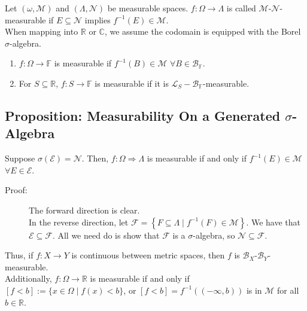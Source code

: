 \documentclass[9pt]{extarticle}
\newcommand{\R}{\mathbb{R}}
\begin{document}
  Let $(\omega,\mathcal{M})$ and $(\Lambda,\mathcal{N})$ be measurable spaces. $f: \Omega \rightarrow \Lambda$ is called $\mathcal{M}$-$\mathcal{N}$-measurable if $E\subseteq \mathcal{N}$ implies $f^{-1}(E)\in \mathcal{M}$.\\

  When mapping into $\R$ or $\mathbb{C}$, we assume the codomain is equipped with the Borel $\sigma$-algebra.
  \begin{enumerate}[(1)]
    \item $f: \Omega \rightarrow \mathbb{F}$ is measurable if $f^{-1}(B) \in \mathcal{M}$ $\forall B\in\mathcal{B}_{\mathbb{F}}$.
    \item For $S\subseteq \R$, $f:S\rightarrow \mathbb{F}$ is measurable if it is $\mathcal{L}_{S}-\mathcal{B}_{\mathbb{F}}$-measurable.
  \end{enumerate}
  \subsection{Proposition: Measurability On a Generated $\sigma$-Algebra}%
  Suppose $\sigma(\mathcal{E}) = \mathcal{N}$. Then, $f:\Omega\Rightarrow \mathcal{\Lambda}$ is measurable if and only if $f^{-1}(E)\in \mathcal{M}$ $\forall E\in \mathcal{E}$.
  \begin{description}
    \item[Proof:] The forward direction is clear.\\

      In the reverse direction, let $\mathcal{F} = \left\{F\subseteq \Lambda \mid f^{-1}(F)\in \mathcal{M}\right\}$. We have that $\mathcal{E}\subseteq \mathcal{F}$. All we need do is show that $\mathcal{F}$ is a $\sigma$-algebra, so $\mathcal{N}\subseteq \mathcal{F}$.
  \end{description}
  Thus, if $f: X\rightarrow Y$ is continuous between metric spaces, then $f$ is $\mathcal{B}_{X}$-$\mathcal{B}_{Y}$-measurable.\\

  Additionally, $f: \Omega \rightarrow \R$ is measurable if and only if $[f < b] := \{x\in \Omega\mid f(x) < b\}$, or $[f < b] = f^{-1}\left((-\infty,b)\right)$ is in $\mathcal{M}$ for all $b\in \R$.
\end{document}
